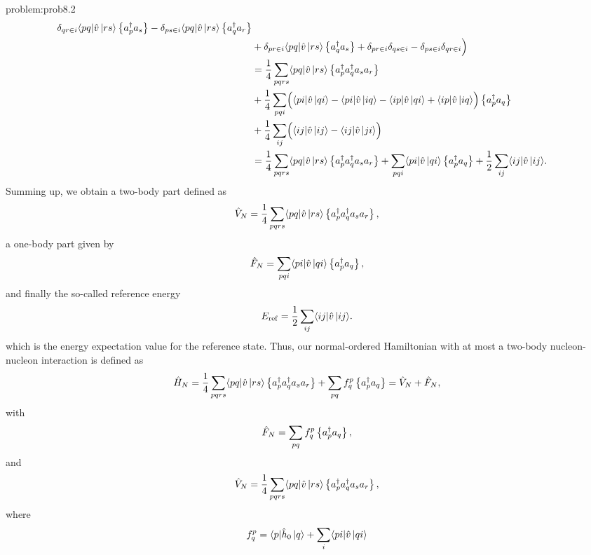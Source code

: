 \begin{prob}
\begin{sol}{problem:prob8.2}
\begin{align*}
      \delta_{qr \in i} \langle pq|\hat{v}\,|{rs}\rangle \left\{a^\dagger_p
        a_s\right\} - \delta_{ps \in i}\langle pq|\hat{v}\,|{rs}\rangle
      \left\{a^\dagger_q a_r\right\}\\ & + \delta_{pr \in i}
      \langle pq|\hat{v}\,|{rs}\rangle \left\{a^\dagger_q a_s\right\}+ \delta_{pr
        \in i} \delta_{qs \in i}- \delta_{ps \in i} \delta_{qr \in i}
      \Bigr) \\ &= \frac{1}{4} \sum_{pqrs} \langle pq|\hat{v}\,|{rs}\rangle
      \left\{a^\dagger_p a^\dagger_q a_s a_r\right\}\\ & + \frac{1}{4}
      \sum_{pqi} \Bigl(\langle pi|\hat{v}\,|{qi}\rangle -
      \langle pi|\hat{v}\,|{iq}\rangle - \langle ip|\hat{v}\,|{qi}\rangle +
      \langle ip|\hat{v}\,|{iq}\rangle\Bigr) \left\{a^\dagger_p a_q\right\}\\ & +
      \frac{1}{4} \sum_{ij} \Bigl(\langle ij|\hat{v}\,|{ij}\rangle-
      \langle ij|\hat{v}\,|{ji}\rangle\Bigr)\\ &= \frac{1}{4} \sum_{pqrs}
      \langle pq|\hat{v}\,|{rs}\rangle \left\{a^\dagger_p a^\dagger_q a_s
        a_r\right\} + \sum_{pqi} \langle pi|\hat{v}\,|{qi}\rangle
      \left\{a^\dagger_p a_q\right\} + \frac{1}{2} \sum_{ij}
      \langle ij|\hat{v}\,|{ij}\rangle.
      \end{align*}
  Summing up, we obtain a two-body part defined as
      \begin{equation*}
              \hat{V}_N = \frac{1}{4} \sum_{pqrs}
              \langle pq|\hat{v}\,|{rs}\rangle \left\{a^\dagger_p
                a^\dagger_q a_s a_r\right\},
      \end{equation*}
  a one-body part given by
      \begin{equation*}
              \hat{F}_N = \sum_{pqi} \langle pi|\hat{v}\,|{qi}\rangle
              \left\{a^\dagger_p a_q\right\},
      \end{equation*}
      and finally the so-called reference energy
      \begin{equation*}
                  E_{\mathrm{ref}}= \frac{1}{2} \sum_{ij}
                  \langle ij|\hat{v}\,|{ij}\rangle.
      \end{equation*}
  which is the energy expectation value for the reference state.
  Thus, our normal-ordered Hamiltonian with at most a two-body
  nucleon-nucleon interaction is defined as
  \[
  \hat{H}_N =\frac{1}{4} \sum_{pqrs} \langle pq|\hat{v}\,|{rs}\rangle
  \left\{a^\dagger_p a^\dagger_q a_s a_r\right\} + \sum_{pq} f_q^p
  \left\{a^\dagger_p a_q\right\}= \hat{V}_N + \hat{F}_N,
  \]
  with
  \[
  \hat{F}_N = \sum_{pq} f_q^p \left\{a^\dagger_p a_q\right\},
  \]
  and
  \[
  \hat{V}_N = \frac{1}{4} \sum_{pqrs} \langle pq|\hat{v}\,|{rs}\rangle
  \left\{a^\dagger_p a^\dagger_q a_s a_r\right\},
  \]
  where
  \[
    f_q^p = \langle p|\hat{h}_0\,|{q}\rangle + \sum_i
    \langle pi|\hat{v}\,|{qi}\rangle
  \]
  \end{sol}


\end{prob}
